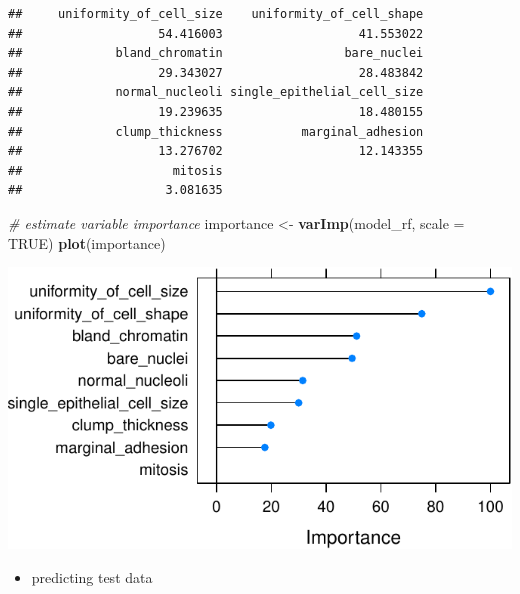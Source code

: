 \documentclass[]{article}
\newenvironment{Shaded}{\begin{snugshade}}{\end{snugshade}}
\newcommand{\KeywordTok}[1]{\textcolor[rgb]{0.13,0.29,0.53}{\textbf{{#1}}}}
\newcommand{\DataTypeTok}[1]{\textcolor[rgb]{0.13,0.29,0.53}{{#1}}}
\newcommand{\StringTok}[1]{\textcolor[rgb]{0.31,0.60,0.02}{{#1}}}
\newcommand{\CommentTok}[1]{\textcolor[rgb]{0.56,0.35,0.01}{\textit{{#1}}}}
\newcommand{\OtherTok}[1]{\textcolor[rgb]{0.56,0.35,0.01}{{#1}}}
\newcommand{\NormalTok}[1]{{#1}}
\providecommand{\tightlist}{%
  \setlength{\itemsep}{0pt}\setlength{\parskip}{0pt}}
\begin{document}
\begin{verbatim}
##     uniformity_of_cell_size    uniformity_of_cell_shape 
##                   54.416003                   41.553022 
##             bland_chromatin                 bare_nuclei 
##                   29.343027                   28.483842 
##             normal_nucleoli single_epithelial_cell_size 
##                   19.239635                   18.480155 
##             clump_thickness           marginal_adhesion 
##                   13.276702                   12.143355 
##                     mitosis 
##                    3.081635
\end{verbatim}

\begin{Shaded}
\begin{Highlighting}[]
\CommentTok{# estimate variable importance}
\NormalTok{importance <-}\StringTok{ }\KeywordTok{varImp}\NormalTok{(model_rf, }\DataTypeTok{scale =} \OtherTok{TRUE}\NormalTok{)}
\KeywordTok{plot}\NormalTok{(importance)}
\end{Highlighting}
\end{Shaded}

\includegraphics{webinar_code_files/figure-latex/importance_rf-1.pdf}

\begin{itemize}
\tightlist
\item
  predicting test data
\end{itemize}

\begin{Shaded}
\end{Shaded}
\end{document}

